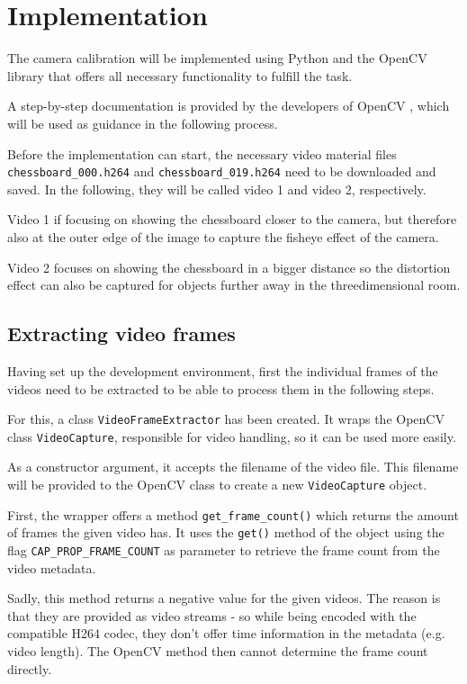 \chapter{Implementation}

The camera calibration will be implemented using Python and the OpenCV library that offers all necessary functionality to fulfill the task.

A step-by-step documentation is provided by the developers of OpenCV \cite{cv_cctut}, which will be used as guidance in the following process.

Before the implementation can start, the necessary video material files \texttt{chessboard\_000.h264} and \texttt{chessboard\_019.h264} need to be downloaded and saved. In the following, they will be called video 1 and video 2, respectively.

Video 1 if focusing on showing the chessboard closer to the camera, but therefore also at the outer edge of the image to capture the fisheye effect of the camera.

Video 2 focuses on showing the chessboard in a bigger distance so the distortion effect can also be captured for objects further away in the threedimensional room.

\section{Extracting video frames}
Having set up the development environment, first the individual frames of the videos need to be extracted to be able to process them in the following steps.

For this, a class \texttt{VideoFrameExtractor} has been created. It wraps the OpenCV class \texttt{VideoCapture}, responsible for video handling, so it can be used more easily. \cite{cv_videocapture}

As a constructor argument, it accepts the filename of the video file. This filename will be provided to the OpenCV class to create a new \texttt{VideoCapture} object.

First, the wrapper offers a method \texttt{get\_frame\_count()} which returns the amount of frames the given video has. It uses the \texttt{get()} method of the object using the flag \texttt{CAP\_PROP\_FRAME\_COUNT} as parameter to retrieve the frame count from the video metadata.

Sadly, this method returns a negative value for the given videos. The reason is that they are provided as video streams - so while being encoded with the compatible H264 codec, they don't offer time information in the metadata (e.g. video length). The OpenCV method then cannot determine the frame count directly.


